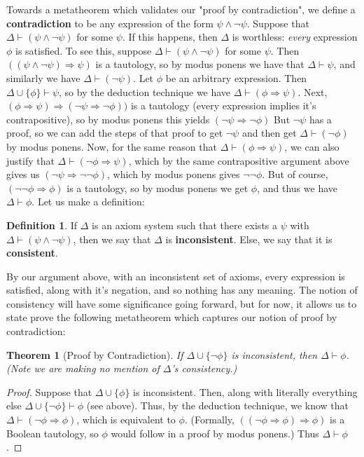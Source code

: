 \documentclass{article}
\theoremstyle{definition}
\newtheorem{definition}{Definition}[section]
\theoremstyle{plain}
\theoremstyle{theorem}
\newtheorem{theorem}{Theorem}[section]
\begin{document}
Towards a metatheorem which validates our "proof by contradiction", we define a \textbf{contradiction} to be any expression of the form $\psi \wedge \neg \psi$. Suppose that $\Delta \vdash (\psi \wedge \neg \psi)$ for some $\psi$. If this happens, then $\Delta$ is worthless: \textit{every} expression $\phi$ is satisfied. To see this, suppose $\Delta \vdash (\psi \wedge \neg \psi)$ for some $\psi$. Then $((\psi \wedge \neg \psi) \Rightarrow \psi)$ is a tautology, so by modus ponens we have that $\Delta \vdash \psi$, and similarly we have $\Delta \vdash (\neg \psi)$. Let $\phi$ be an arbitrary expression. Then $\Delta \cup \{\phi\} \vdash \psi$, so by the deduction technique we have $\Delta \vdash (\phi \Rightarrow \psi)$. Next, $(\phi \Rightarrow \psi) \Rightarrow (\neg \psi \Rightarrow \neg \phi))$ is a tautology (every expression implies it's contrapositive), so by modus ponens this yields $(\neg \psi \Rightarrow \neg \phi)$ But $\neg \psi$ has a proof, so we can add the steps of that proof to get $\neg \psi$ and then get $\Delta \vdash (\neg \phi)$ by modus ponens. Now, for the same reason that $\Delta \vdash (\phi \Rightarrow \psi)$, we can also justify that $\Delta \vdash (\neg \phi \Rightarrow \psi)$, which by the same contrapositive argument above gives us $(\neg \psi \Rightarrow \neg \neg \phi)$, which by modus ponens gives $\neg \neg \phi$. But of course, $(\neg \neg \phi \Rightarrow \phi)$ is a tautology, so by modus ponens we get $\phi$, and thus we have $\Delta \vdash \phi$. Let us make a definition:
\begin{definition}
    If $\Delta$ is an axiom system such that there exists a $\psi$ with $\Delta \vdash (\psi \wedge \neg \psi)$, then we say that $\Delta$ is \textbf{inconsistent}. Else, we say that it is \textbf{consistent}.
\end{definition}
By our argument above, with an inconsistent set of axioms, every expression is satisfied, along with it's negation, and so nothing has any meaning. The notion of consistency will have some significance going forward, but for now, it allows us to state prove the following metatheorem which captures our notion of proof by contradiction:
\begin{theorem}[Proof by Contradiction]
    If $\Delta \cup \{\neg \phi\}$ is inconsistent, then $\Delta \vdash \phi$. (Note we are making no mention of $\Delta$'s consistency.)
\end{theorem}
\begin{proof}
    Suppose that $\Delta \cup \{\phi\}$ is inconsistent. Then, along with literally everything else $\Delta \cup \{\neg \phi\} \vdash \phi$ (see above). Thus, by the deduction technique, we know that $\Delta \vdash (\neg \phi \Rightarrow \phi)$, which is equivalent to $\phi$. (Formally, $((\neg \phi \Rightarrow \phi) \Rightarrow \phi)$ is a Boolean tautology, so $\phi$ would follow in a proof by modus ponens.) Thus $\Delta \vdash \phi$.
\end{proof}
\end{document}
